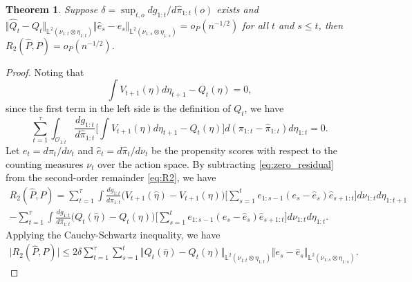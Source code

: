 \documentclass{article}
\theoremstyle{plain}
\newtheorem{theorem}{Theorem}[section]
\theoremstyle{definition}
\theoremstyle{remark}
\begin{document}
\begin{theorem}
    \label{thm:dr}
    Suppose $\delta=\sup_{t,o} dg_{1:t}/d\hat{\pi}_{1:t}(o)$ exists and $\big\Vert \hat{Q}_{t}-Q_{t}
    \big\Vert_{\mathbb{L}^2(\nu_{1:t}\otimes\eta_{1:t})}
    \big\Vert \hat{e}_s-e_s\big\Vert_{\mathbb{L}^2(\nu_{1:s}\otimes\eta_{1:s})} = o_P(n^{-1/2})$ for all $t$ and $s\le t$, then $R_2(\hat{P},P)=o_P(n^{-1/2})$.
\end{theorem}

\begin{proof}
Noting that 
\begin{equation}
    \int V_{t+1}(\eta)d\eta_{t+1} - Q_t(\eta) = 0,
\end{equation}
since the first term in the left side is the definition of $Q_t$, we have
\begin{equation}
    \label{eq:zero_residual}
    \sum_{t=1}^\tau\int_{\mathcal{O}_{1:t}}\frac{dg_{1:t}}{d\hat{\pi}_{1:t}}\Big[\int V_{t+1}(\eta)d\eta_{t+1}-Q_t(\eta)\Big]d(\pi_{1:t}-\hat{\pi}_{1:t})d\eta_{1:t}=0.
\end{equation}
Let $e_t=d\pi_t/d\nu_t$ and $\hat{e}_t=d\hat{\pi}_t/d\nu_t$ be the propensity scores with respect to the counting measures $\nu_t$ over the action space. By subtracting \eqref{eq:zero_residual} from the second-order remainder \eqref{eq:R2}, we have
\begin{align}
    R_2(\hat{P},P)=\sum_{t=1}^\tau\int \frac{dg_{1:t}}{d\hat{\pi}_{1:t}}\big(V_{t+1}(\hat{\eta})-V_{t+1}(\eta)\big)\Big[\sum_{s=1}^te_{1:s-1}(e_s-\hat{e}_s)\hat{e}_{s+1:t}\Big]d\nu_{1:t}d\eta_{1:t+1} \\
    -\sum_{t=1}^\tau\int \frac{dg_{1:t}}{d\hat{\pi}_{1:t}}\big(Q_t(\hat{\eta})-Q_t(\eta)\big)\Big[\sum_{s=1}^te_{1:s-1}(e_s-\hat{e}_s)\hat{e}_{s+1:t}\Big]d\nu_{1:t}d\eta_{1:t}.
\end{align}
Applying the Cauchy-Schwartz inequality, we have 
\begin{align}
    \big|R_2(\hat{P},P)\big| \le
    2\delta \sum_{t=1}^\tau \sum_{s=1}^t
    \big\Vert Q_{t}(\hat{\eta})-Q_{t}(\eta)
    \big\Vert_{\mathbb{L}^2(\nu_{1:t}\otimes\eta_{1:t})}
    \big\Vert e_s-\hat{e}_s\big\Vert_{\mathbb{L}^2(\nu_{1:s}\otimes\eta_{1:s})}.
\end{align}
\end{proof}
\end{document}
